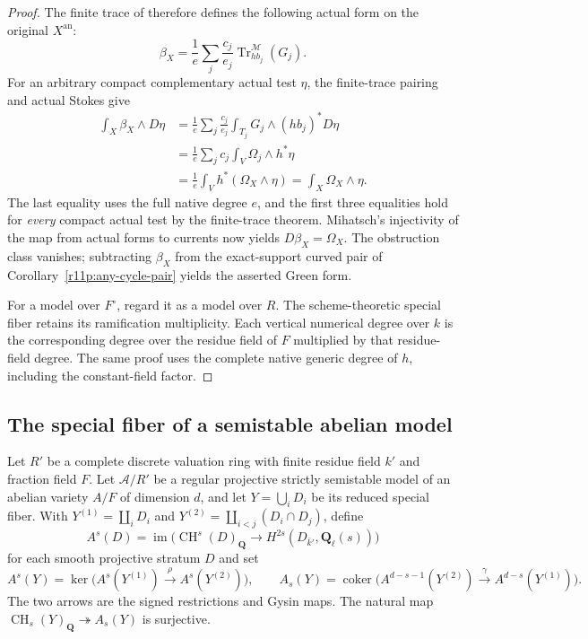 \documentclass[11pt]{article}
\theoremstyle{definition}
\theoremstyle{remark}
\numberwithin{equation}{section}
\newcommand{\CH}{\operatorname{CH}}
\newcommand{\an}{\mathrm{an}}
\newcommand{\Tr}{\operatorname{Tr}}
\begin{document}
\begin{proof}
The finite trace of  therefore
defines the following actual form on the original $X^{\an}$:
\begin{equation}\label{eq:descent-primitive}
 \beta_X=\frac1e\sum_j\frac{c_j}{e_j}
                  \Tr^{\mathscr M}_{h b_j}(G_j).
\end{equation}
For an arbitrary compact complementary actual test $\eta$, the
finite-trace pairing and actual Stokes give
\[
 \begin{aligned}
 \int_X\beta_X\wedge D\eta
   &=\frac1e\sum_j\frac{c_j}{e_j}
                   \int_{T_j}G_j\wedge(hb_j)^*D\eta\\
   &=\frac1e\sum_jc_j\int_V\Omega_j\wedge h^*\eta\\
   &=\frac1e\int_Vh^*(\Omega_X\wedge\eta)
     =\int_X\Omega_X\wedge\eta.
 \end{aligned}
\]
The last equality uses the full native degree $e$, and the first
three equalities hold for \emph{every} compact actual test by the
finite-trace theorem.  Mihatsch's injectivity of the map from
actual forms to currents now yields $D\beta_X=\Omega_X$.
The obstruction class vanishes; subtracting $\beta_X$ from the
exact-support curved pair of Corollary~\ref{r11p:any-cycle-pair} yields
the asserted Green form.

For a model over $F^\circ$, regard it as a model over $R$.
The scheme-theoretic special fiber retains its ramification
multiplicity.  Each vertical numerical degree over $k$ is the
corresponding degree over the residue field of $F$ multiplied
by that residue-field degree.  The same proof uses the complete
native generic degree of $h$, including the constant-field factor.
\end{proof}

\subsection{The special fiber of a semistable abelian model}

Let $R'$ be a complete discrete valuation ring with finite residue
field $k'$ and fraction field $F$.  Let $\mathcal A/R'$ be a regular
projective strictly semistable model of an abelian variety $A/F$
of dimension $d$, and let $Y=\bigcup_iD_i$ be its reduced special
fiber.  With $Y^{(1)}=\coprod_iD_i$ and
$Y^{(2)}=\coprod_{i<j}(D_i\cap D_j)$, define
\[
 A^s(D)=\operatorname{im}\bigl(\CH^s(D)_{\mathbf Q}
           \to H^{2s}(D_{\bar k'},\mathbf Q_\ell(s))\bigr)
\]
for each smooth projective stratum $D$ and set
\begin{equation}\label{eq:kun-strata}
 A^s(Y)=\ker\bigl(A^s(Y^{(1)})\xrightarrow{\rho}A^s(Y^{(2)})\bigr),
 \qquad
 A_s(Y)=\operatorname{coker}\bigl(
 A^{d-s-1}(Y^{(2)})\xrightarrow{\gamma}A^{d-s}(Y^{(1)})\bigr).
\end{equation}
The two arrows are the signed restrictions and Gysin maps.
The natural map $\CH_s(Y)_{\mathbf Q}\twoheadrightarrow A_s(Y)$
is surjective.
\end{document}
